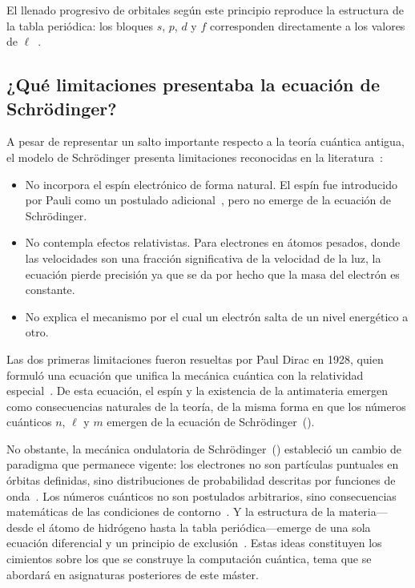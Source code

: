 \documentclass[11pt,a4paper,spanish]{book}
\begin{document}
El llenado progresivo de orbitales según este principio reproduce la
estructura de la tabla periódica: los bloques \(s\), \(p\), \(d\) y
\(f\) corresponden directamente a los valores de
\(\ell\)~\citep{pauli1925}.

\subsection{¿Qué limitaciones presentaba la ecuación de Schrödinger?}

A pesar de representar un salto importante respecto a la teoría
cuántica antigua, el modelo de Schrödinger presenta limitaciones
reconocidas en la literatura~\citep{dirac1928}:

\begin{itemize}[nosep]
  \item No incorpora el espín electrónico de forma natural. El espín
    fue introducido por Pauli como un postulado
    adicional~\citep{pauli1925}, pero no emerge de la ecuación de Schrödinger.
  \item No contempla efectos relativistas. Para electrones en átomos
    pesados, donde las velocidades son una fracción significativa de
    la velocidad de la luz, la ecuación pierde precisión ya que se da
    por hecho que la masa del electrón es constante.
  \item No explica el mecanismo por el cual un electrón salta de un
    nivel energético a otro.
\end{itemize}

Las dos primeras limitaciones fueron resueltas por Paul Dirac en
1928, quien formuló una ecuación que unifica la mecánica cuántica con
la relatividad especial~\citep{dirac1928}. De esta ecuación, el espín
y la existencia
de la antimateria emergen como consecuencias naturales de la teoría,
de la misma forma en que los números cuánticos \(n\), \(\ell\) y
\(m\) emergen de la ecuación de
Schrödinger~(\citeyear{schrodinger1926}).

No obstante, la mecánica ondulatoria de
Schrödinger~(\citeyear{schrodinger1926}) estableció un cambio de paradigma
que permanece vigente: los electrones no son partículas puntuales en
órbitas definidas, sino distribuciones de probabilidad descritas por
funciones de onda~\citep{born1926}. Los números cuánticos no son
postulados arbitrarios, sino consecuencias matemáticas de las
condiciones de contorno~\citep{schrodinger1926}. Y la estructura de
la materia—desde el átomo de hidrógeno hasta la tabla
periódica—emerge de una sola ecuación diferencial y un principio de
exclusión~\citep{pauli1925}. Estas ideas constituyen los cimientos
sobre los que se construye la computación cuántica, tema
que se abordará en asignaturas posteriores de este máster.
\end{document}
